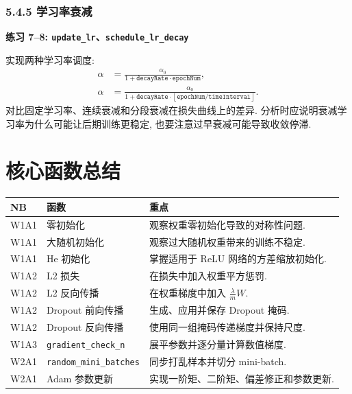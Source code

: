 \documentclass{../../nndlcourse}
\begin{document}
\subsubsection*{5.4.5 学习率衰减}

\textbf{练习 7--8: \texttt{update\_lr}、\texttt{schedule\_lr\_decay}}

实现两种学习率调度:
\begin{align}
    \alpha &= \frac{\alpha_0}{1+\texttt{decayRate}\cdot\texttt{epochNum}},\\
    \alpha &= \frac{\alpha_0}
    {1+\texttt{decayRate}\cdot
    \left\lfloor \texttt{epochNum}/\texttt{timeInterval}\right\rfloor}.
\end{align}
对比固定学习率、连续衰减和分段衰减在损失曲线上的差异. 分析时应说明衰减学习率为什么可能让后期训练更稳定, 也要注意过早衰减可能导致收敛停滞.


\section{核心函数总结}

\begin{center}
\begin{tabular}{|p{1.4cm}|p{5.1cm}|p{5.8cm}|}
\hline
\textbf{NB} & \textbf{函数} & \textbf{重点} \\
\hline
W1A1 & 零初始化 & 观察权重零初始化导致的对称性问题. \\
\hline
W1A1 & 大随机初始化 & 观察过大随机权重带来的训练不稳定. \\
\hline
W1A1 & He 初始化 & 掌握适用于 ReLU 网络的方差缩放初始化. \\
\hline
W1A2 & L2 损失 & 在损失中加入权重平方惩罚. \\
\hline
W1A2 & L2 反向传播 & 在权重梯度中加入 $\frac{\lambda}{m}W$. \\
\hline
W1A2 & Dropout 前向传播 & 生成、应用并保存 Dropout 掩码. \\
\hline
W1A2 & Dropout 反向传播 & 使用同一组掩码传递梯度并保持尺度. \\
\hline
W1A3 & \texttt{gradient\_check\_n} & 展平参数并逐分量计算数值梯度. \\
\hline
W2A1 & \texttt{random\_mini\_batches} & 同步打乱样本并切分 mini-batch. \\
\hline
W2A1 & Adam 参数更新 & 实现一阶矩、二阶矩、偏差修正和参数更新. \\
\hline
\end{tabular}
\end{center}
\end{document}
